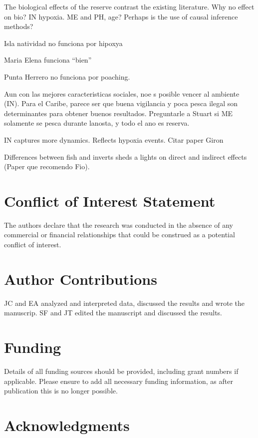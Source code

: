 \documentclass{frontiersSCNS}
\theoremstyle{definition}
\theoremstyle{definition}
\theoremstyle{definition}
\theoremstyle{remark}
\begin{document}
The biological effects of the reserve contrast the existing literature.
Why no effect on bio? IN hypoxia. ME and PH, age? Perhaps is the use of
causal inference methods?

Isla natividad no funciona por hipoxya

Maria Elena funciona ``bien''

Punta Herrero no funciona por poaching.

Aun con las mejores caracteristicas sociales, noe s posible vencer al
ambiente (IN). Para el Caribe, parece ser que buena vigilancia y poca
pesca ilegal son determinantes para obtener buenos resultados.
Preguntarle a Stuart si ME solamente se pesca durante lanosta, y todo el
ano es reserva.

IN captures more dynamics. Reflects hypoxia events. Citar paper Giron

Differences between fish and inverts sheds a lights on direct and
indirect effects (Paper que recomendo Fio).

\section*{Conflict of Interest Statement}

The authors declare that the research was conducted in the absence of
any commercial or financial relationships that could be construed as a
potential conflict of interest.

\section*{Author Contributions}

JC and EA analyzed and interpreted data, discussed the results and wrote
the manuscrip. SF and JT edited the manuscript and discussed the
results.

\section*{Funding}

Details of all funding sources should be provided, including grant
numbers if applicable. Please ensure to add all necessary funding
information, as after publication this is no longer possible.

\section*{Acknowledgments}
\end{document}

